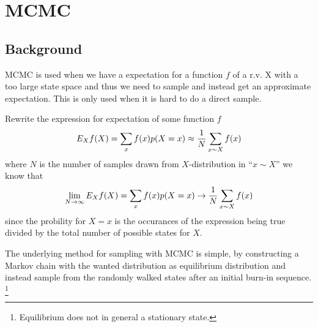 \documentclass[a4paper,11pt]{kth-mag}
\begin{document}
            \subsection{}
            
        \section{MCMC}
            \subsection{Background}
                MCMC is used when we have a expectation for a function $f$ of a r.v. X with a too large state space 
                and thus we need to sample and instead get an approximate expectation. This is only used when it is hard to do a direct sample.
                
                Rewrite the expression for expectation of some function $f$
                \begin{equation}
                    E_X f(X) 
                    = \sum\limits_x f(x)p{(X=x)} 
                    \approx \frac{1}{N} \sum\limits_{x\sim X} f(x)
                \end{equation}
                where $N$ is the number of samples drawn from $X$-distribution in ``$x\sim X$'' we know that
                \begin{equation}
                    \lim_{N\rightarrow\infty} E_X f(X) 
                    = \sum\limits_x f(x)p{(X=x)} 
                    \rightarrow \frac{1}{N} \sum\limits_{x\sim X} f(x)
                \end{equation}
                since the probility for $X=x$ is the occurances of the expression being true 
                divided by the total number of possible states for $X$.

                The underlying method for sampling with MCMC is simple, by 
                constructing a Markov chain with the wanted distribution as 
                equilibrium distribution and instead sample from 
                the randomly walked states after an initial burn-in sequence.
                \footnote{Equilibrium does not in general a stationary state.}
\end{document}
